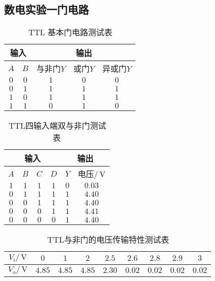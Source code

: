 \documentclass{ctexart}
\renewcommand{\rm}{\,\mathrm}
\begin{document}
    \subsection{数电实验一\quad 门电路}
    \begin{table}[h]
    	\centering
    	\caption{$\rm{TTL}$ 基本门电路测试表}
    	\begin{tabular}{|c|c|c|c|c|}
    		\hline
    		\multicolumn{2}{|c}{输入} & \multicolumn{3}{|c|}{输出}\\
    		\hline
    		$A$ & $B$ & 与非门$Y$ & 或门$Y$ & 异或门$Y$\\
    		\hline
    		$0$ & $0$ & $1$ & $0$ & $0$\\
    		\hline
    		$0$ & $1$ & $1$ & $1$ & $1$\\
    		\hline
    		$1$ & $0$ & $1$ & $1$ & $1$\\
    		\hline
    		$1$ & $1$ & $0$ & $1$ & $0$\\
    		\hline
    	\end{tabular}
    \end{table}
    \begin{table}[h]
    	\centering
    	\caption{$\rm{TTL}$四输入端双与非门测试表}
    	\begin{tabular}{|c|c|c|c|c|c|}
    		\hline
    		\multicolumn{4}{|c|}{输入} & \multicolumn{2}{|c|}{输出}\\
    		\hline
    		$A$ & $B$ & $C$ & $D$ & $Y$ & 电压$/\rm{V}$\\
    		\hline
    		$1$ & $1$ & $1$ & $1$ & $0$ & $0.03$\\
    		\hline
    		$0$ & $1$ & $1$ & $1$ & $1$ & $4.40$\\
    		\hline
    		$0$ & $0$ & $1$ & $1$ & $1$ & $4.40$\\
    		\hline
    		$0$ & $0$ & $0$ & $1$ & $1$ & $4.41$\\
    		\hline
    		$0$ & $0$ & $0$ & $0$ & $1$ & $4.40$\\
    		\hline
    	\end{tabular}
    \end{table}
    \begin{table}[h]
    	\centering
    	\caption{$\rm{TTL}$与非门的电压传输特性测试表}
    	\begin{tabular}{|c|c|c|c|c|c|c|c|c|}
    		\hline
    		$V_{\mathrm{i}}/\rm{V}$ & $0$ & $1$ & $2$ & $2.5$ & $2.6$ & $2.8$ & $2.9$ & $3$\\
    		\hline
    		$V_{\mathrm{o}}/\rm{V}$ & $4.85$ & $4.85$ & $4.85$ & $2.30$ & $0.02$ & $0.02$ & $0.02$ & $0.02$\\
    		\hline
    	\end{tabular}
    \end{table}
\end{document}
